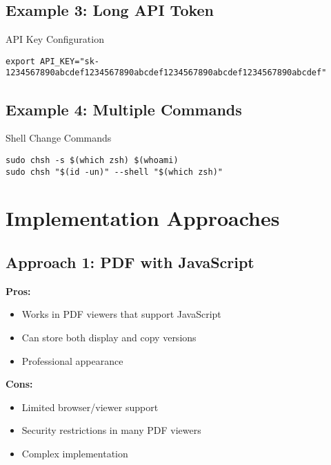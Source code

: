 \documentclass{article}
\begin{document}
\subsection{Example 3: Long API Token}

\begin{clickablecode}{API Key Configuration}
\begin{lstlisting}
export API_KEY="sk-1234567890abcdef1234567890abcdef1234567890abcdef1234567890abcdef"
\end{lstlisting}
\end{clickablecode}

\subsection{Example 4: Multiple Commands}

\begin{clickablecode}{Shell Change Commands}
\begin{lstlisting}
sudo chsh -s $(which zsh) $(whoami)
sudo chsh "$(id -un)" --shell "$(which zsh)"
\end{lstlisting}
\end{clickablecode}

\section{Implementation Approaches}

\subsection{Approach 1: PDF with JavaScript}

\begin{tcolorbox}[colback=blue!5, colframe=blue!40, title=PDF JavaScript Solution]
\textbf{Pros:}
\begin{itemize}
    \item Works in PDF viewers that support JavaScript
    \item Can store both display and copy versions
    \item Professional appearance
\end{itemize}

\textbf{Cons:}
\begin{itemize}
    \item Limited browser/viewer support
    \item Security restrictions in many PDF viewers
    \item Complex implementation
\end{itemize}
\end{tcolorbox}
\end{document}
